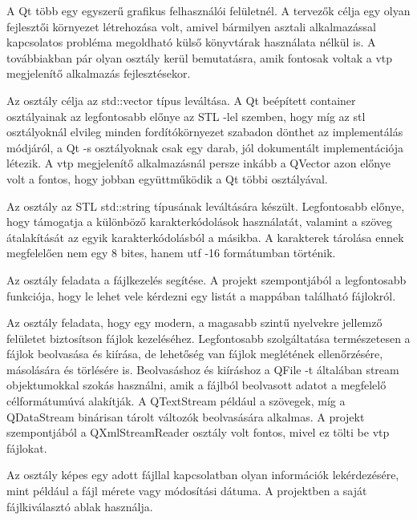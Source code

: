 A Qt több egy egyszerű grafikus felhasználói felületnél. 
A tervezők célja egy olyan fejlesztői környezet létrehozása volt, 
amivel bármilyen asztali alkalmazással kapcsolatos 
probléma megoldható külső könyvtárak használata nélkül is. 
A továbbiakban pár olyan osztály kerül bemutatásra, 
amik fontosak voltak a vtp megjelenítő alkalmazás fejlesztésekor.
\begin{description}[font=\normalfont\itshape\space]
\item [QVector:] 
Az osztály célja az {\ttfamily std::vector} típus leváltása. 
A Qt beépített container osztályainak
az legfontosabb előnye az STL -lel szemben, 
hogy míg az stl osztályoknál 
elvileg minden fordítókörnyezet szabadon dönthet az implementálás módjáról, 
a Qt -s osztályoknak csak egy darab, 
jól dokumentált implementációja létezik. 
A vtp megjelenítő alkalmazásnál persze inkább 
a {\ttfamily QVector} azon előnye volt a fontos, 
hogy jobban együttműködik a Qt többi osztályával.
\item [QString:] 
Az osztály az STL {\ttfamily std::string} típusának leváltására készült. 
Legfontosabb előnye, 
hogy támogatja a különböző karakterkódolások használatát, 
valamint a szöveg átalakítását az egyik karakterkódolásból a másikba. 
A karakterek tárolása ennek megfelelően nem egy 8 bites, 
hanem utf -16 formátumban történik. 
\item [QDir:] 
Az osztály feladata a fájlkezelés segítése. 
A projekt szempontjából a legfontosabb funkciója, 
hogy le lehet vele kérdezni egy listát a mappában található fájlokról.
\item [QFile:] 
Az osztály feladata, 
hogy egy modern, a magasabb szintű nyelvekre 
jellemző felületet biztosítson fájlok kezeléséhez. 
Legfontosabb szolgáltatása természetesen a fájlok beolvasása és kiírása, 
de lehetőség van fájlok meglétének ellenőrzésére, 
másolására és törlésére is. 
Beolvasáshoz és kiíráshoz a {\ttfamily QFile} -t 
általában stream objektumokkal szokás használni, 
amik a fájlból beolvasott adatot a megfelelő célformátumúvá alakítják. 
A {\ttfamily QTextStream} például a szövegek, 
míg a {\ttfamily QDataStream} binárisan tárolt változók beolvasására alkalmas. 
A projekt szempontjából a {\ttfamily QXmlStreamReader} osztály volt fontos, 
mivel ez tölti be vtp fájlokat. 
\item [QFileInfo:]
Az osztály képes egy adott fájllal kapcsolatban 
olyan információk lekérdezésére, 
mint például a fájl mérete vagy módosítási dátuma. 
A projektben a saját fájlkiválasztó ablak használja.
\end{description}

